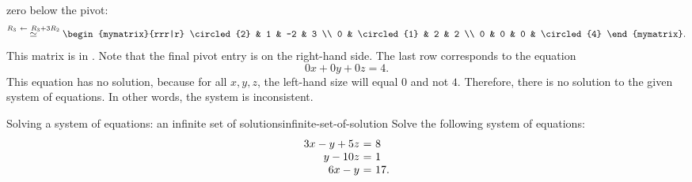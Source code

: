 \begin{solution}
  zero below the pivot:
  \begin{equation*}
  \stackrel{R_3\rowop R_3+3R_2}{\roweq}
    \begin{mymatrix}{rrr|r}
      \circled{2} &  1 &  -2 & 3 \\
      0 &  \circled{1} &   2 & 2 \\
      0 & 0 & 0 & \circled{4}
    \end{mymatrix}.
  \end{equation*}
  This matrix is in {\ef}. Note that the final pivot entry is on the
  right-hand side. The last row corresponds to the equation
  \begin{equation*}
    0x + 0y + 0z = 4.
  \end{equation*}
  This equation has no solution, because for all $x,y,z$, the
  left-hand size will equal $0$ and not $4$. Therefore, there is no
  solution to the given system of equations. In other words, the
  system is inconsistent.
\end{solution}

\begin{example}{Solving a system of equations: an infinite set of solutions}{infinite-set-of-solution}
  Solve the following system of equations:
  \begin{equation}
    \begin{array}{r@{~}c@{~}l}
      3x  -y + 5z  &=& 8 \\
           y - 10z &=& 1 \\
      6x  -y       &=& 17.
    \end{array}
  \end{equation}
\end{example}

